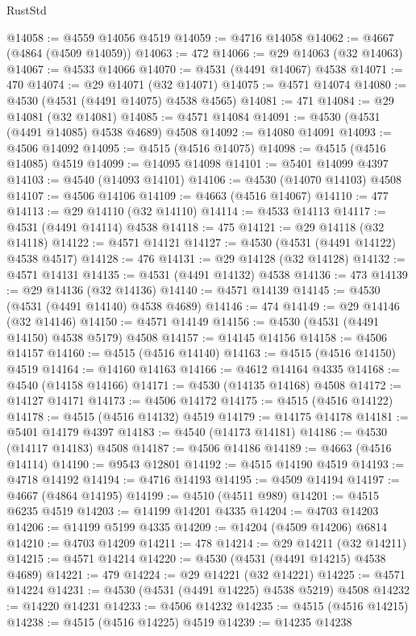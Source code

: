 \begin{lexlean}{RustStd}
\begin{coremodule}
{\begin{coremodule}
{{{{{{{{{{{{{{{{{{{{{{{{{{{{{{{{{{{{{{{{{{{{{{{{{{{{{{{@14058 := @4559 @14056 @4519
@14059 := @4716 @14058
@14062 := @4667 (@4864 (@4509 @14059))
@14063 := 472
@14066 := @29 @14063 (@32 @14063)
@14067 := @4533 @14066
@14070 := @4531 (@4491 @14067) @4538
@14071 := 470
@14074 := @29 @14071 (@32 @14071)
@14075 := @4571 @14074
@14080 := @4530 (@4531 (@4491 @14075) @4538 @4565)
@14081 := 471
@14084 := @29 @14081 (@32 @14081)
@14085 := @4571 @14084
@14091 := @4530 (@4531 (@4491 @14085) @4538 @4689) @4508
@14092 := @14080 @14091
@14093 := @4506 @14092
@14095 := @4515 (@4516 @14075)
@14098 := @4515 (@4516 @14085) @4519
@14099 := @14095 @14098
@14101 := @5401 @14099 @4397
@14103 := @4540 (@14093 @14101)
@14106 := @4530 (@14070 @14103) @4508
@14107 := @4506 @14106
@14109 := @4663 (@4516 @14067)
@14110 := 477
@14113 := @29 @14110 (@32 @14110)
@14114 := @4533 @14113
@14117 := @4531 (@4491 @14114) @4538
@14118 := 475
@14121 := @29 @14118 (@32 @14118)
@14122 := @4571 @14121
@14127 := @4530 (@4531 (@4491 @14122) @4538 @4517)
@14128 := 476
@14131 := @29 @14128 (@32 @14128)
@14132 := @4571 @14131
@14135 := @4531 (@4491 @14132) @4538
@14136 := 473
@14139 := @29 @14136 (@32 @14136)
@14140 := @4571 @14139
@14145 := @4530 (@4531 (@4491 @14140) @4538 @4689)
@14146 := 474
@14149 := @29 @14146 (@32 @14146)
@14150 := @4571 @14149
@14156 := @4530 (@4531 (@4491 @14150) @4538 @5179) @4508
@14157 := @14145 @14156
@14158 := @4506 @14157
@14160 := @4515 (@4516 @14140)
@14163 := @4515 (@4516 @14150) @4519
@14164 := @14160 @14163
@14166 := @4612 @14164 @4335
@14168 := @4540 (@14158 @14166)
@14171 := @4530 (@14135 @14168) @4508
@14172 := @14127 @14171
@14173 := @4506 @14172
@14175 := @4515 (@4516 @14122)
@14178 := @4515 (@4516 @14132) @4519
@14179 := @14175 @14178
@14181 := @5401 @14179 @4397
@14183 := @4540 (@14173 @14181)
@14186 := @4530 (@14117 @14183) @4508
@14187 := @4506 @14186
@14189 := @4663 (@4516 @14114)
@14190 := @9543 @12801
@14192 := @4515 @14190 @4519
@14193 := @4718 @14192
@14194 := @4716 @14193
@14195 := @4509 @14194
@14197 := @4667 (@4864 @14195)
@14199 := @4510 (@4511 @989)
@14201 := @4515 @6235 @4519
@14203 := @14199 @14201 @4335
@14204 := @4703 @14203
@14206 := @14199 @5199 @4335
@14209 := @14204 (@4509 @14206) @6814
@14210 := @4703 @14209
@14211 := 478
@14214 := @29 @14211 (@32 @14211)
@14215 := @4571 @14214
@14220 := @4530 (@4531 (@4491 @14215) @4538 @4689)
@14221 := 479
@14224 := @29 @14221 (@32 @14221)
@14225 := @4571 @14224
@14231 := @4530 (@4531 (@4491 @14225) @4538 @5219) @4508
@14232 := @14220 @14231
@14233 := @4506 @14232
@14235 := @4515 (@4516 @14215)
@14238 := @4515 (@4516 @14225) @4519
@14239 := @14235 @14238
}}}}}}}}}}}}}}}}}}}}}}}}}}}}}}}}}}}}}}}}}}}}}}}}}}}}}}}
\end{coremodule}}
\end{coremodule}
\end{lexlean}
